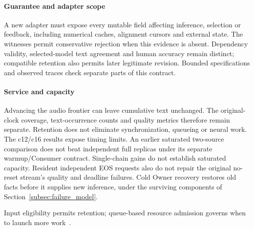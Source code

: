\paragraph{Guarantee and adapter scope}
A new adapter must expose every mutable field affecting inference,
selection or feedback, including numerical caches, alignment cursors and
external state. The witnesses permit conservative rejection when this
evidence is absent. Dependency validity, selected-model text agreement
and human accuracy remain distinct; compatible retention also permits
later legitimate revision. Bounded specifications and observed traces
check separate parts of this contract.

\paragraph{Service and capacity}
Advancing the audio frontier can leave cumulative text unchanged.
The original-clock coverage, text-occurrence counts and quality metrics
therefore remain separate. Retention does not eliminate synchronization,
queueing or neural work. The c12/c16 results expose timing limits. An
earlier saturated two-source comparison does not beat independent full
replicas under its separate warmup/Consumer contract. Single-chain gains
do not establish saturated capacity.
Resident independent EOS requests also do not repair the original
no-reset stream's quality and deadline failures. Cold Owner recovery
restores old facts before it supplies new inference, under the surviving
components of Section~\ref{subsec:failure_model}.

Input eligibility permits retention; queue-based resource admission
governs when to launch more work~\cite{welsh2001seda}.
